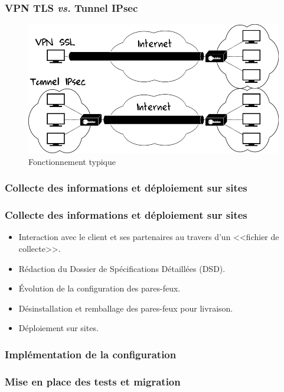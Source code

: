\documentclass[french, a4paper]{beamer}
\begin{document}
\begin{frame}
    \frametitle{VPN TLS \textit{vs.} Tunnel IPsec}
    \begin{figure}[h!]
        \centering
        \includegraphics[width = \linewidth]{img/misc/tls-vs-ipsec.png}
        \caption{Fonctionnement typique}%
        \label{fig:misc/tls-vs-ipsec}
    \end{figure}
\end{frame}

\subsubsection{Collecte des informations et déploiement sur sites}

\begin{frame}
    \frametitle{Collecte des informations et déploiement sur sites}
    \begin{itemize}
        \item Interaction avec le client et ses partenaires au travers d'un
            <<fichier de collecte>>.
        \item Rédaction du Dossier de Spécifications Détaillées (DSD).
        \item Évolution de la configuration des pares-feux.
        \item Désinstallation et remballage des pares-feux pour livraison.
        \item Déploiement sur sites.
    \end{itemize}
\end{frame}

\subsubsection{Implémentation de la configuration}
\subsubsection{Mise en place des tests et migration}
\end{document}
